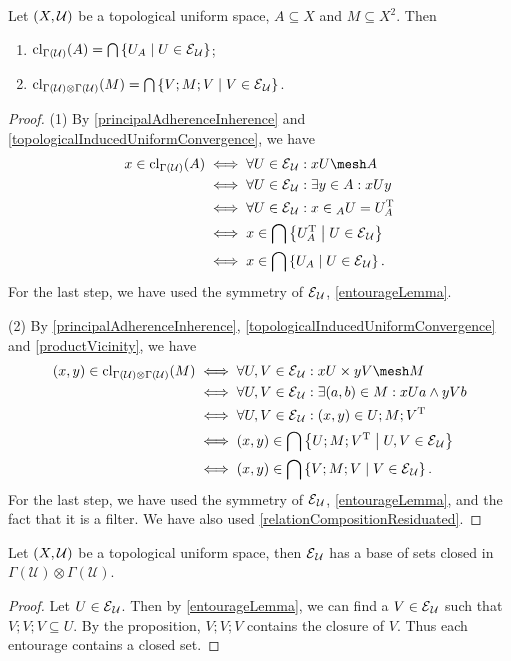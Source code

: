 \begin{proposition}
Let $\left( X,\mathcal{U} \right)$ be a topological uniform space, $A\subseteq X$ and $M\subseteq X^2$. Then
\begin{enumerate}
\item $\operatorname{cl}_{\Gamma(\mathcal{U})}(A) = \bigcap\left\{ U_A \;\middle|\; U\in \operatorname{\mathcal{E}}_\mathcal{U} \right\}$;
\item $\operatorname{cl}_{\Gamma(\mathcal{U})\otimes \Gamma(\mathcal{U})}(M) = \bigcap\left\{ V;M;V \;\middle|\; V\in\operatorname{\mathcal{E}}_\mathcal{U} \right\}$.
\end{enumerate}
\end{proposition}
\begin{proof}
(1) By \ref{principalAdherenceInherence} and \ref{topologicalInducedUniformConvergence}, we have
\begin{align*}
x\in \closure_{\Gamma(\mathcal{U})}(A) &\iff \forall U\in \entourage_\mathcal{U}: xU \mesh A \\
&\iff \forall U\in \entourage_\mathcal{U}: \exists y\in A: xUy \\
&\iff \forall U\in \entourage_\mathcal{U}: x\in {_A}U = U^\transp_A \\
&\iff x\in\bigcap\setbuilder{U^\transp_A}{U\in \entourage_\mathcal{U}} \\
&\iff x\in\bigcap\setbuilder{U_A}{U\in \entourage_\mathcal{U}}.
\end{align*}
For the last step, we have used the symmetry of $\operatorname{\mathcal{E}}_\mathcal{U}$, \ref{entourageLemma}.

(2) By \ref{principalAdherenceInherence}, \ref{topologicalInducedUniformConvergence} and \ref{productVicinity}, we have
\begin{align*}
(x,y) \in \closure_{\Gamma(\mathcal{U})\otimes \Gamma(\mathcal{U})}(M) &\iff \forall U,V\in \entourage_\mathcal{U}: xU \times yV \mesh M \\
&\iff \forall U,V\in \entourage_\mathcal{U}:\exists (a,b)\in M: xUa \land yVb \\
&\iff \forall U,V\in \entourage_\mathcal{U}:(x,y) \in U;M;V^\transp \\
&\iff (x,y) \in \bigcap\setbuilder{U;M;V^\transp}{U,V\in\entourage_\mathcal{U}} \\
&\iff (x,y) \in \bigcap\setbuilder{V;M;V}{V\in\entourage_\mathcal{U}}.
\end{align*}
For the last step, we have used the symmetry of $\operatorname{\mathcal{E}}_\mathcal{U}$, \ref{entourageLemma}, and the fact that it is a filter. We have also used \ref{relationCompositionResiduated}.
\end{proof}
\begin{corollary}
Let $\left( X,\mathcal{U} \right)$ be a topological uniform space, then $\operatorname{\mathcal{E}}_\mathcal{U}$ has a base of sets closed in $\Gamma(\mathcal{U})\otimes \Gamma(\mathcal{U})$.
\end{corollary}
\begin{proof}
Let $U\in \operatorname{\mathcal{E}}_\mathcal{U}$. Then by \ref{entourageLemma}, we can find a $V\in\operatorname{\mathcal{E}}_\mathcal{U}$ such that $V;V;V\subseteq U$. By the proposition, $V;V;V$ contains the closure of $V$. Thus each entourage contains a closed set.
\end{proof}

